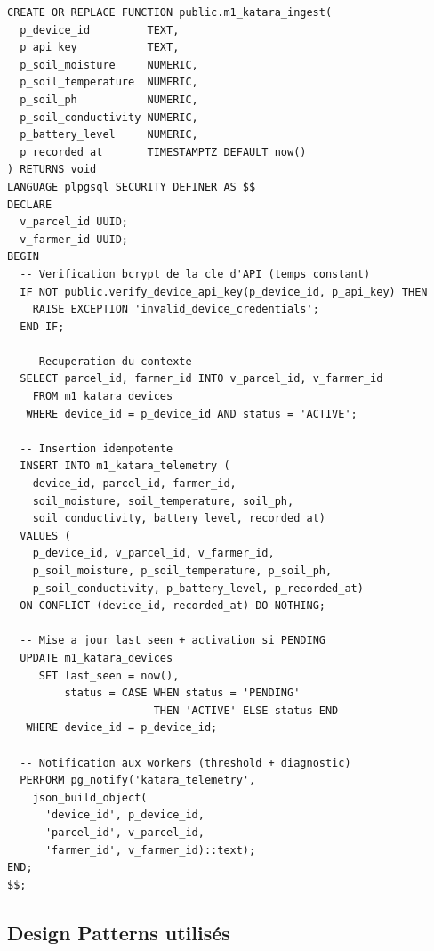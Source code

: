 \documentclass[12pt,a4paper]{report}
\begin{document}
\begin{lstlisting}[style=sql, caption={Fonction \texttt{m1\_katara\_ingest()} --- ingestion atomique télémétrique},
                   label=lst:ingest]
CREATE OR REPLACE FUNCTION public.m1_katara_ingest(
  p_device_id         TEXT,
  p_api_key           TEXT,
  p_soil_moisture     NUMERIC,
  p_soil_temperature  NUMERIC,
  p_soil_ph           NUMERIC,
  p_soil_conductivity NUMERIC,
  p_battery_level     NUMERIC,
  p_recorded_at       TIMESTAMPTZ DEFAULT now()
) RETURNS void
LANGUAGE plpgsql SECURITY DEFINER AS $$
DECLARE
  v_parcel_id UUID;
  v_farmer_id UUID;
BEGIN
  -- Verification bcrypt de la cle d'API (temps constant)
  IF NOT public.verify_device_api_key(p_device_id, p_api_key) THEN
    RAISE EXCEPTION 'invalid_device_credentials';
  END IF;

  -- Recuperation du contexte
  SELECT parcel_id, farmer_id INTO v_parcel_id, v_farmer_id
    FROM m1_katara_devices
   WHERE device_id = p_device_id AND status = 'ACTIVE';

  -- Insertion idempotente
  INSERT INTO m1_katara_telemetry (
    device_id, parcel_id, farmer_id,
    soil_moisture, soil_temperature, soil_ph,
    soil_conductivity, battery_level, recorded_at)
  VALUES (
    p_device_id, v_parcel_id, v_farmer_id,
    p_soil_moisture, p_soil_temperature, p_soil_ph,
    p_soil_conductivity, p_battery_level, p_recorded_at)
  ON CONFLICT (device_id, recorded_at) DO NOTHING;

  -- Mise a jour last_seen + activation si PENDING
  UPDATE m1_katara_devices
     SET last_seen = now(),
         status = CASE WHEN status = 'PENDING'
                       THEN 'ACTIVE' ELSE status END
   WHERE device_id = p_device_id;

  -- Notification aux workers (threshold + diagnostic)
  PERFORM pg_notify('katara_telemetry',
    json_build_object(
      'device_id', p_device_id,
      'parcel_id', v_parcel_id,
      'farmer_id', v_farmer_id)::text);
END;
$$;
\end{lstlisting}

\subsection{Design Patterns utilisés}
\end{document}
